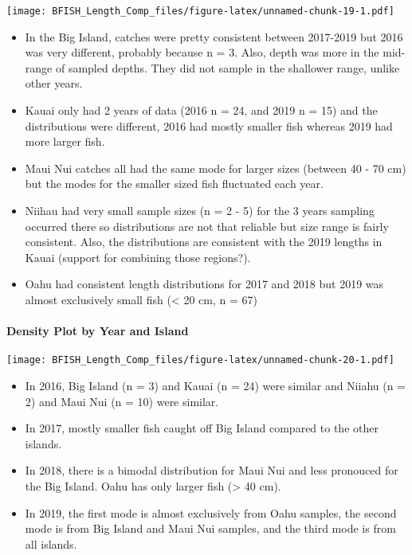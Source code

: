 \documentclass[
]{article}
\providecommand{\tightlist}{%
  \setlength{\itemsep}{0pt}\setlength{\parskip}{0pt}}
\begin{document}
\texttt{[image: BFISH\_Length\_Comp\_files/figure-latex/unnamed-chunk-19-1.pdf]}

\begin{itemize}
\tightlist
\item
  In the Big Island, catches were pretty consistent between 2017-2019
  but 2016 was very different, probably because n = 3. Also, depth was
  more in the mid-range of sampled depths. They did not sample in the
  shallower range, unlike other years.\\
\item
  Kauai only had 2 years of data (2016 n = 24, and 2019 n = 15) and the
  distributions were different, 2016 had mostly smaller fish whereas
  2019 had more larger fish.\\
\item
  Maui Nui catches all had the same mode for larger sizes (between 40 -
  70 cm) but the modes for the smaller sized fish fluctuated each
  year.\\
\item
  Niihau had very small sample sizes (n = 2 - 5) for the 3 years
  sampling occurred there so distributions are not that reliable but
  size range is fairly consistent. Also, the distributions are
  consistent with the 2019 lengths in Kauai (support for combining those
  regions?).\\
\item
  Oahu had consistent length distributions for 2017 and 2018 but 2019
  was almost exclusively small fish (\textless{} 20 cm, n = 67)
\end{itemize}

\hypertarget{density-plot-by-year-and-island}{%
\paragraph{Density Plot by Year and
Island}\label{density-plot-by-year-and-island}}

\texttt{[image: BFISH\_Length\_Comp\_files/figure-latex/unnamed-chunk-20-1.pdf]}

\begin{itemize}
\tightlist
\item
  In 2016, Big Island (n = 3) and Kauai (n = 24) were similar and Niiahu
  (n = 2) and Maui Nui (n = 10) were similar.\\
\item
  In 2017, mostly smaller fish caught off Big Island compared to the
  other islands.
\item
  In 2018, there is a bimodal distribution for Maui Nui and less
  pronouced for the Big Island. Oahu has only larger fish
  (\textgreater{} 40 cm).\\
\item
  In 2019, the first mode is almost exclusively from Oahu samples, the
  second mode is from Big Island and Maui Nui samples, and the third
  mode is from all islands.
\end{itemize}
\end{document}
